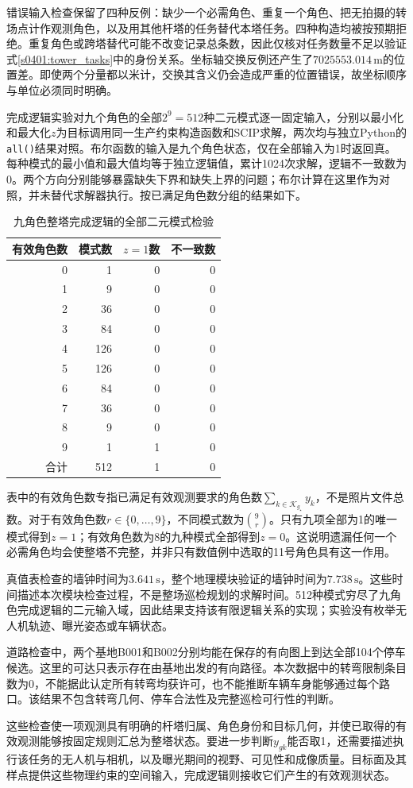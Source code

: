 错误输入检查保留了四种反例：缺少一个必需角色、重复一个角色、把无拍摄的转场点计作观测角色，以及用其他杆塔的任务替代本塔任务。四种构造均被按预期拒绝。重复角色或跨塔替代可能不改变记录总条数，因此仅核对任务数量不足以验证式\eqref{s0401:tower_tasks}中的身份关系。坐标轴交换反例还产生了$7025553.014\,\mathrm m$的位置差。即使两个分量都以米计，交换其含义仍会造成严重的位置错误，故坐标顺序与单位必须同时明确。

完成逻辑实验对九个角色的全部$2^9=512$种二元模式逐一固定输入，分别以最小化和最大化$z$为目标调用同一生产约束构造函数和SCIP求解\cite{SCIP100}，两次均与独立Python的\texttt{all()}结果对照。布尔函数的输入是九个角色状态，仅在全部输入为1时返回真。每种模式的最小值和最大值均等于独立逻辑值，累计1024次求解，逻辑不一致数为0。两个方向分别能够暴露缺失下界和缺失上界的问题；布尔计算在这里作为对照，并未替代求解器执行。按已满足角色数分组的结果如下。

\begin{table}[htbp]
 \centering
 \small
 \caption{九角色整塔完成逻辑的全部二元模式检验}
 \begin{tabular}{@{}rrrr@{}}
  \toprule
  有效角色数 & 模式数 & $z=1$数 & 不一致数\\
  \midrule
  0 & 1   & 0 & 0\\
  1 & 9   & 0 & 0\\
  2 & 36  & 0 & 0\\
  3 & 84  & 0 & 0\\
  4 & 126 & 0 & 0\\
  5 & 126 & 0 & 0\\
  6 & 84  & 0 & 0\\
  7 & 36  & 0 & 0\\
  8 & 9   & 0 & 0\\
  9 & 1   & 1 & 0\\
  \midrule
  合计 & 512 & 1 & 0\\
  \bottomrule
 \end{tabular}
\end{table}

表中的有效角色数专指已满足有效观测要求的角色数$\sum_{k\in\mathcal K_{g_\star}}y_k$，不是照片文件总数。对于有效角色数$r\in\{0,\ldots,9\}$，不同模式数为$\binom{9}{r}$。只有九项全部为1的唯一模式得到$z=1$；有效角色数为8的九种模式全部得到$z=0$。这说明遗漏任何一个必需角色均会使整塔不完整，并非只有数值例中选取的11号角色具有这一作用。

真值表检查的墙钟时间为$3.641\,\mathrm s$，整个地理模块验证的墙钟时间为$7.738\,\mathrm s$。这些时间描述本次模块检查过程，不是整场巡检规划的求解时间。512种模式穷尽了九角色完成逻辑的二元输入域，因此结果支持该有限逻辑关系的实现；实验没有枚举无人机轨迹、曝光姿态或车辆状态。

道路检查中，两个基地B001和B002分别均能在保存的有向图上到达全部104个停车候选。这里的可达只表示存在由基地出发的有向路径。本次数据中的转弯限制条目数为0，不能据此认定所有转弯均获许可，也不能推断车辆车身能够通过每个路口。该结果不包含转弯几何、停车合法性及完整巡检可行性的判断。

这些检查使一项观测具有明确的杆塔归属、角色身份和目标几何，并使已取得的有效观测能够按固定规则汇总为整塔状态。要进一步判断$y_{gk}$能否取1，还需要描述执行该任务的无人机与相机，以及曝光期间的视野、可见性和成像质量。目标面及其样点提供这些物理约束的空间输入，完成逻辑则接收它们产生的有效观测状态。
